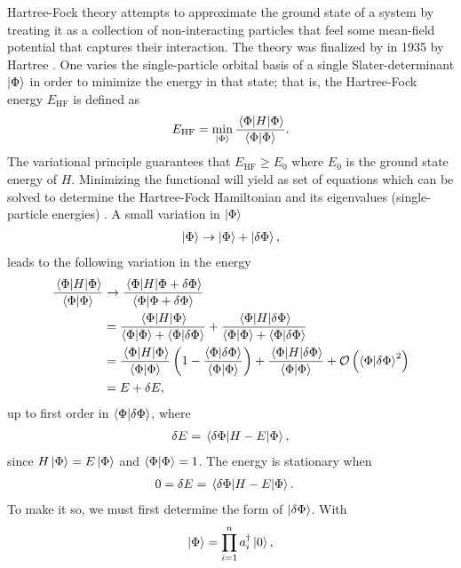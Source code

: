 \documentclass[Dual]{msu-thesis}
\begin{document}
Hartree-Fock theory attempts to approximate the ground state of a system by treating it as a collection of non-interacting particles that feel some mean-field potential that captures their interaction. The theory was finalized by in 1935 by Hartree \cite{hartree}. One varies the single-particle orbital basis of a single Slater-determinant $\ket{\Phi}$ in order to minimize the energy in that state; that is, the Hartree-Fock energy $E_{\text{HF}}$ is defined as
\begin{align}
E_{\text{HF}}
=
\min_{\ket{\Phi}}\frac{\mel{\Phi}{H}{\Phi}}{\bra{\Phi}\ket{\Phi}}.
\end{align}
The variational principle guarantees that $E_{\text{HF}}\geq E_0$
where $E_0$ is the ground state energy of $H$. Minimizing the functional will yield as set of equations which can be solved to determine the Hartree-Fock Hamiltonian and its eigenvalues (single-particle energies) \cite{hf_derivation}. A small variation in $\ket{\Phi}$
\begin{align}
\ket{\Phi}\to\ket{\Phi}+\ket{\delta\Phi},
\end{align}
leads to the following variation in the energy
\begin{align}
\frac{\mel{\Phi}{H}{\Phi}}{\bra{\Phi}\ket{\Phi}}
&\to
\frac{\mel{\Phi}{H}{\Phi+\delta\Phi}}{\bra{\Phi}\ket{\Phi+\delta\Phi}}
\\
&=
\frac{\mel{\Phi}{H}{\Phi}}{\bra{\Phi}\ket{\Phi}+\bra{\Phi}\ket{\delta\Phi}}
+
\frac{\mel{\Phi}{H}{\delta\Phi}}{\bra{\Phi}\ket{\Phi}+\bra{\Phi}\ket{\delta\Phi}}
\\
&=
\frac{\mel{\Phi}{H}{\Phi}}{\bra{\Phi}\ket{\Phi}}
\left(1-\frac{\bra{\Phi}\ket{\delta\Phi}}{\bra{\Phi}\ket{\Phi}}\right)
+
\frac{\mel{\Phi}{H}{\delta\Phi}}{\bra{\Phi}\ket{\Phi}}
+
\mathcal{O}\left(\bra{\Phi}\ket{\delta\Phi}^2\right)
\\
&=
E+\delta E,
\end{align}
up to first order in $\bra{\Phi}\ket{\delta\Phi}$, where
\begin{align}
\delta E = \mel{\delta\Phi}{H-E}{\Phi},
\end{align}
since $H\ket{\Phi}=E\ket{\Phi}$ and $\bra{\Phi}\ket{\Phi}=1$. The energy is stationary when
\begin{align}
\label{hf_energy_stationary}
0
&=
\delta E
=
\mel{\delta\Phi}{H-E}{\Phi}.
\end{align}
To make it so, we must first determine the form of $\ket{\delta\Phi}$. With
\begin{align}
\ket{\Phi}
=
\prod_{i=1}^na^\dagger_i\ket{0},
\end{align}
\end{document}
